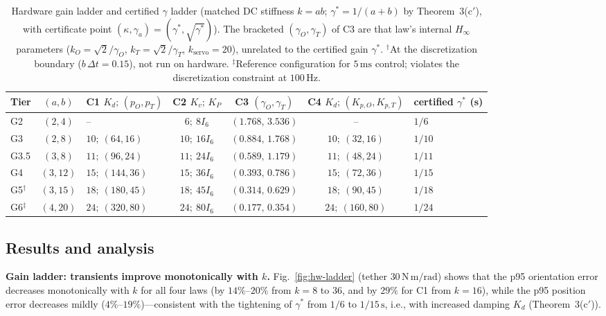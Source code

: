 \begin{table}[!tbp]
\centering\footnotesize
\caption{Hardware gain ladder and certified $\gamma$ ladder (matched DC stiffness $k=ab$; $\gamma^{*}=1/(a+b)$ by Theorem~3(c$'$), with certificate point $(\kappa,\gamma_a)=(\gamma^{*},\sqrt{\gamma^{*}})$). The bracketed $(\gamma_O,\gamma_T)$ of C3 are that law's internal $H_\infty$ parameters ($k_O=\sqrt2/\gamma_O$, $k_T=\sqrt2/\gamma_T$, $k_{\mathrm{servo}}=20$), unrelated to the certified gain $\gamma^{*}$. $^\dagger$At the discretization boundary ($b\,\Delta t=0.15$), not run on hardware. $^\ddagger$Reference configuration for $5\,\mathrm{ms}$ control; violates the discretization constraint at $100\,\mathrm{Hz}$.}
\label{tab:hw-gains}
\begin{tabular}{@{}lclcccl@{}}
\toprule
Tier & $(a,b)$ & C1 $K_d;\,(p_O,p_T)$ & C2 $K_v;\,K_P$ & C3 $(\gamma_O,\gamma_T)$ & C4 $K_d;\,(K_{p,O},K_{p,T})$ & certified $\gamma^{*}$ (s) \\
\midrule
G2 & $(2,4)$ & -- & $6;\ 8I_6$ & $(1.768,\,3.536)$ & -- & $1/6$ \\
G3 & $(2,8)$ & $10;\ (64,16)$ & $10;\ 16I_6$ & $(0.884,\,1.768)$ & $10;\ (32,16)$ & $1/10$ \\
G3.5 & $(3,8)$ & $11;\ (96,24)$ & $11;\ 24I_6$ & $(0.589,\,1.179)$ & $11;\ (48,24)$ & $1/11$ \\
G4 & $(3,12)$ & $15;\ (144,36)$ & $15;\ 36I_6$ & $(0.393,\,0.786)$ & $15;\ (72,36)$ & $1/15$ \\
G5$^\dagger$ & $(3,15)$ & $18;\ (180,45)$ & $18;\ 45I_6$ & $(0.314,\,0.629)$ & $18;\ (90,45)$ & $1/18$ \\
G6$^{\ddagger}$ & $(4,20)$ & $24;\ (320,80)$ & $24;\ 80I_6$ & $(0.177,\,0.354)$ & $24;\ (160,80)$ & $1/24$ \\
\bottomrule
\end{tabular}
\end{table}

\subsection{Results and analysis}

\textbf{Gain ladder: transients improve monotonically with $k$.} Fig.~\ref{fig:hw-ladder} (tether $30\,\mathrm{N\,m/rad}$) shows that the p95 orientation error decreases monotonically with $k$ for all four laws (by $14\%$--$20\%$ from $k{=}8$ to $36$, and by $29\%$ for C1 from $k{=}16$), while the p95 position error decreases mildly ($4\%$--$19\%$)---consistent with the tightening of $\gamma^{*}$ from $1/6$ to $1/15\,\mathrm{s}$, i.e., with increased damping $K_d$ (Theorem~3(c$'$)).


